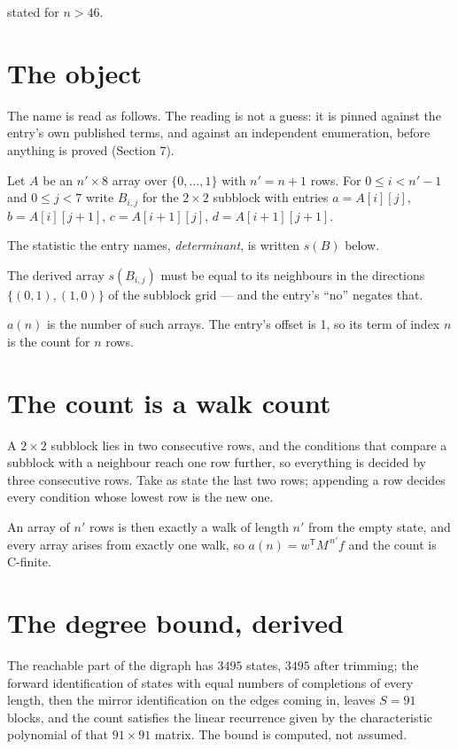 \documentclass[11pt]{article}
\theoremstyle{definition}
\begin{document}
stated for $n > 46$.

\section{The object}

The name is read as follows. The reading is not a guess: it is pinned against the entry's own published terms, and against an independent enumeration, before anything is proved (Section 7).

Let $A$ be an $n' \times 8$ array over $\{0,\dots,1\}$ with $n' = n + 1$ rows. For $0 \le i < n'-1$ and $0 \le j < 7$ write $B_{i,j}$ for the $2\times2$ subblock with entries $a = A[i][j]$, $b = A[i][j{+}1]$, $c = A[i{+}1][j]$, $d = A[i{+}1][j{+}1]$.

The statistic the entry names, {\itshape determinant}, is written $s(B)$ below.

The derived array $s(B_{i,j})$ must be equal to its neighbours in the directions $\{(0,1), (1,0)\}$ of the subblock grid --- and the entry's ``no'' negates that.

$a(n)$ is the number of such arrays. The entry's offset is 1, so its term of index $n$ is the count for $n$ rows.

\section{The count is a walk count}

A $2\times2$ subblock lies in two consecutive rows, and the conditions that compare a subblock with a neighbour reach one row further, so everything is decided by three consecutive rows. Take as state the last two rows; appending a row decides every condition whose lowest row is the new one.

An array of $n'$ rows is then exactly a walk of length $n'$ from the empty state, and every array arises from exactly one walk, so $a(n) = w^{\mathsf T}M^{\,n'}f$ and the count is C-finite.

\section{The degree bound, derived}

The reachable part of the digraph has $3495$ states, $3495$ after trimming; the forward identification of states with equal numbers of completions of every length, then the mirror identification on the edges coming in, leaves $S = 91$ blocks, and the count satisfies the linear recurrence given by the characteristic polynomial of that $91\times91$ matrix. The bound is computed, not assumed.
\end{document}
